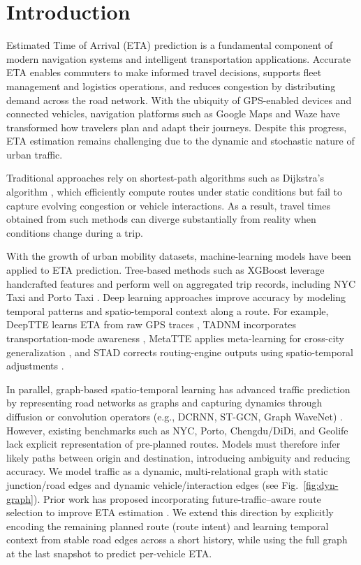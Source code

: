 \section{Introduction}
Estimated Time of Arrival (ETA) prediction is a fundamental component of modern navigation systems and intelligent transportation applications. Accurate ETA enables commuters to make informed travel decisions, supports fleet management and logistics operations, and reduces congestion by distributing demand across the road network. With the ubiquity of GPS-enabled devices and connected vehicles, navigation platforms such as Google Maps and Waze \cite{derrowpinion2021googlemaps,hoseinzadeh2020waze,amin-naseri2018waze} have transformed how travelers plan and adapt their journeys. Despite this progress, ETA estimation remains challenging due to the dynamic and stochastic nature of urban traffic.

Traditional approaches rely on shortest-path algorithms such as Dijkstra's algorithm \cite{dijkstra1959}, which efficiently compute routes under static conditions but fail to capture evolving congestion or vehicle interactions. As a result, travel times obtained from such methods can diverge substantially from reality when conditions change during a trip.

With the growth of urban mobility datasets, machine-learning models have been applied to ETA prediction. Tree-based methods such as XGBoost \cite{chen2016xgboost} leverage handcrafted features and perform well on aggregated trip records, including NYC Taxi and Porto Taxi \cite{nyc_tlc,moreira2013porto}. Deep learning approaches improve accuracy by modeling temporal patterns and spatio-temporal context along a route. For example, DeepTTE learns ETA from raw GPS traces \cite{wang2018deeptte}, TADNM incorporates transportation-mode awareness \cite{xu2020tadnm}, MetaTTE applies meta-learning for cross-city generalization \cite{wang2022metatte}, and STAD corrects routing-engine outputs using spatio-temporal adjustments \cite{abbar2020stad}.

In parallel, graph-based spatio-temporal learning has advanced traffic prediction by representing road networks as graphs and capturing dynamics through diffusion or convolution operators (e.g., DCRNN, ST-GCN, Graph WaveNet) \cite{li2018dcrnn,yu2018stgcn,wu2019graphwavenet}. However, existing benchmarks such as NYC, Porto, Chengdu/DiDi, and Geolife \cite{nyc_tlc,moreira2013porto,didi2016,zheng2012geolife} lack explicit representation of pre-planned routes. Models must therefore infer likely paths between origin and destination, introducing ambiguity and reducing accuracy. We model traffic as a dynamic, multi-relational graph with static junction/road edges and dynamic vehicle/interaction edges (see Fig.~\ref{fig:dyn-graph}). Prior work has proposed incorporating future-traffic–aware route selection to improve ETA estimation \cite{voloch2021}. We extend this direction by explicitly encoding the remaining planned route (route intent) and learning temporal context from 
stable road edges across a short history, while using the full graph at the last snapshot to predict per-vehicle ETA.

